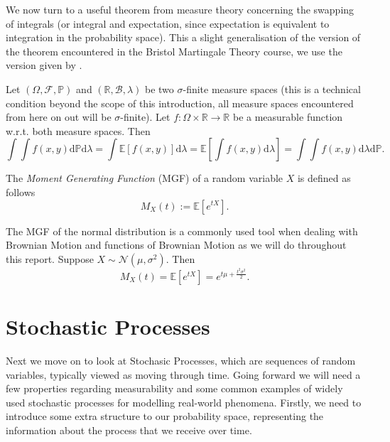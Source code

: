 We now turn to a useful theorem from measure theory concerning 
the swapping of integrals (or integral and expectation, since expectation is 
equivalent to integration in the probability space). This a slight generalisation 
of the version of the theorem encountered in the Bristol Martingale Theory course,
we use the version given by \textcite{tao}.

\begin{theorem}
    Let $(\Omega,\mathcal{F},\mathbb{P})$ and $(\mathbb{R},\mathcal{B},\lambda)$
    be two $\sigma$-finite measure spaces (this is a technical condition beyond the 
    scope of this introduction, all measure spaces encountered from here on out will
    be $\sigma$-finite). Let $f:\Omega\times\mathbb{R}\rightarrow\mathbb{R}$ be a 
    measurable function w.r.t. both measure spaces. Then
    \begin{equation}\label{eq:1.13}
        \int\int f(x,y)\mathrm d\mathbb{P}\mathrm d\lambda=\int\mathbb{E}[f(x,y)]\mathrm d\lambda=\mathbb{E}\left[\int f(x,y)\mathrm d\lambda\right]=\int \int f(x,y)\mathrm d\lambda\mathrm d\mathbb{P}.
    \end{equation}
\end{theorem}

\begin{definition}
    The \emph{Moment Generating Function} (MGF) of a random variable $X$ is defined as follows
    \begin{equation*}
        M_X(t):=\mathbb{E}[e^{tX}].
    \end{equation*}
\end{definition}

\begin{remark}
    The MGF of the normal distribution is a commonly used tool when dealing with
    Brownian Motion and functions of Brownian Motion as we will do throughout this
    report. Suppose $X\sim\mathcal{N}(\mu,\sigma^2)$. Then
    \begin{equation}
        M_X(t)=\mathbb{E}[e^{tX}]=e^{t\mu+\frac{t^2\sigma^2}{2}}.
    \end{equation}
\end{remark}

\section{Stochastic Processes}\label{sec:1.4}

Next we move on to look at Stochasic Processes, which are sequences
of random variables, typically viewed as moving through time. Going forward we will 
need a few properties regarding measurability and some common examples of widely used 
stochastic processes for modelling real-world phenomena. Firstly, we need to introduce 
some extra structure to our probability space, representing the information about the 
process that we receive over time.

